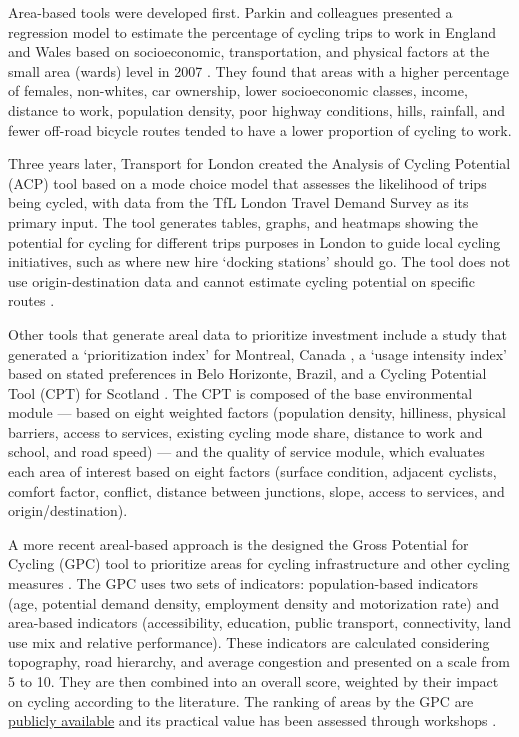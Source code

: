 \documentclass[
  super,
  preprint,
  3p]{elsarticle}
\begin{document}
Area-based tools were developed first. Parkin and colleagues presented a
regression model to estimate the percentage of cycling trips to work in
England and Wales based on socioeconomic, transportation, and physical
factors at the small area (wards) level in 2007
\citep{parkin_estimation_2007}. They found that areas with a higher
percentage of females, non-whites, car ownership, lower socioeconomic
classes, income, distance to work, population density, poor highway
conditions, hills, rainfall, and fewer off-road bicycle routes tended to
have a lower proportion of cycling to work.

Three years later, Transport for London created the Analysis of Cycling
Potential (ACP) tool based on a mode choice model that assesses the
likelihood of trips being cycled, with data from the TfL London Travel
Demand Survey as its primary input. The tool generates tables, graphs,
and heatmaps showing the potential for cycling for different trips
purposes in London to guide local cycling initiatives, such as where new
hire `docking stations' should go. The tool does not use
origin-destination data and cannot estimate cycling potential on
specific routes \citep{transport_for_london_analysis_2010}.

Other tools that generate areal data to prioritize investment include a
study that generated a `prioritization index' for Montreal, Canada
\citep{larsen_build_2013}, a `usage intensity index' based on stated
preferences in Belo Horizonte, Brazil, and a Cycling Potential Tool
(CPT) for Scotland \citep{phillips_development_2017}. The CPT is
composed of the base environmental module --- based on eight weighted
factors (population density, hilliness, physical barriers, access to
services, existing cycling mode share, distance to work and school, and
road speed) --- and the quality of service module, which evaluates each
area of interest based on eight factors (surface condition, adjacent
cyclists, comfort factor, conflict, distance between junctions, slope,
access to services, and origin/destination).

A more recent areal-based approach is the designed the Gross Potential
for Cycling (GPC) tool to prioritize areas for cycling infrastructure
and other cycling measures \citep{silva_gross_2021}. The GPC uses two
sets of indicators: population-based indicators (age, potential demand
density, employment density and motorization rate) and area-based
indicators (accessibility, education, public transport, connectivity,
land use mix and relative performance). These indicators are calculated
considering topography, road hierarchy, and average congestion and
presented on a scale from 5 to 10. They are then combined into an
overall score, weighted by their impact on cycling according to the
literature. The ranking of areas by the GPC are
\href{https://boost.up.pt/en/ferramentas/gpc}{publicly available} and
its practical value has been assessed through workshops
\citep{silva_revealing_2022}.
\end{document}
